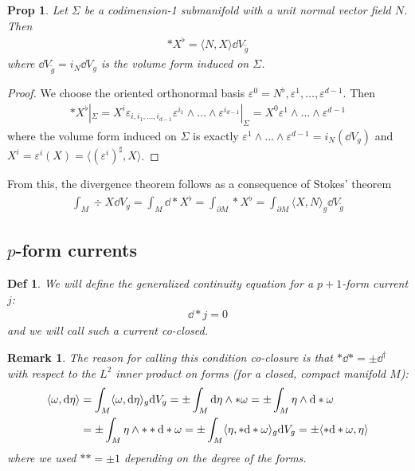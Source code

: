 \documentclass[11pt]{article}
\newtheorem{defn}{Def}
\newtheorem{prop}{Prop}
\newtheorem{rmk}{Remark}
\renewcommand{\epsilon}{\varepsilon}
\begin{document}
\begin{prop}\label{prop:outflow}
  Let $\Sigma$ be a codimension-1 submanifold with a unit normal vector field
  $N$. Then
  \begin{align}
    * X^\flat = \langle N, X \rangle \dd V_{\tilde g}
  \end{align}
  where $\dd V_{\tilde g} = i_N \dd V_{g}$ is the volume form induced on $\Sigma$.
\end{prop}
\begin{proof}
  We choose the oriented orthonormal basis $\epsilon^0 = N^\flat, \epsilon^1, \ldots, \epsilon^{d-1}$. Then
\begin{align}
*X^\flat|_{\Sigma} = X^i \epsilon_{i, i_1, \ldots, i_{d-1}}\epsilon^{i_1} \wedge \ldots \wedge \epsilon^{i_{d-1}}|_{\Sigma} = X^0 \epsilon^{1} \wedge \ldots \wedge \epsilon^{d-1}
\end{align}
where the volume form induced on $\Sigma$ is exactly $\epsilon^1 \wedge \ldots
\wedge \epsilon^{d-1} = i_N(\dd V_g)$ and $X^i = \epsilon^i(X) = \langle
(\epsilon^i)^\sharp, X\rangle$.
\end{proof}
From this, the divergence theorem follows as a consequence of Stokes' theorem
\begin{align}
\int_M \div X \dd V_g = \int_M \dd * X^\flat = \int_{\partial M} * X^\flat = \int_{\partial M}\langle  X, N \rangle_g \dd V_{\tilde g}
\end{align}

\subsection{$p$-form currents}

\begin{defn}
We will define the generalized continuity equation for a $p+1$-form current $j$:
\begin{align}
\dd * j = 0
\end{align}
and we will call such a current co-closed.
\end{defn}
\begin{rmk}
  The reason for calling this condition co-closure is that $*\dd* = \pm \dd^\dagger$
  with respect to the $L^2$ inner product on forms (for a closed, compact
  manifold $M$):
  \begin{align}
    \langle \omega, \dd\eta  \rangle &= \int_M \langle \omega, \dd \eta\rangle_g   \dd V_g
                                     = \pm \int_M \dd \eta \wedge * \omega 
                                       = \pm\int_M\eta \wedge \dd * \omega\notag\\
                                       &
                                     = \pm \int_M \eta \wedge ** \dd * \omega
                                     = \pm \int_M \langle  \eta, * \dd * \omega \rangle_g \dd V_g
    = \pm \langle  * \dd * \omega, \eta \rangle
  \end{align}
  where we used $** = \pm 1$ depending on the degree of the forms.
\end{rmk}
\end{document}
